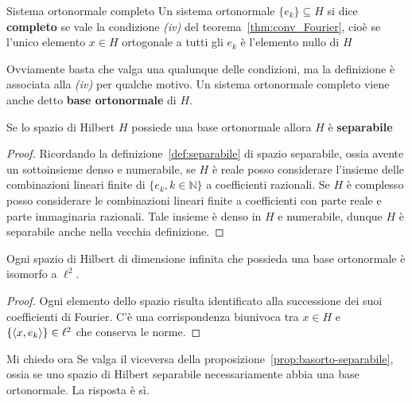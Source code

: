 \begin{definition}{Sistema ortonormale completo}
    Un sistema ortonormale \(\{e_{k}\} \subseteq H \) si dice \textbf{completo}
    se vale la condizione \textit{(iv)} del teorema~\ref{thm:conv_Fourier}, cioè
    se l'unico elemento \(x \in H\) ortogonale a tutti gli \(e_{k}\) è
    l'elemento nullo di \(H\) 
\end{definition}
Ovviamente basta che valga una qualunque delle condizioni, ma la definizione è
associata alla \textit{(iv)} per qualche motivo. Un sistema ortonormale completo
viene anche detto \textbf{base ortonormale} di \(H\).
\begin{proposition}\label{prop:basorto-separabile}
Se lo spazio di Hilbert \(H\) possiede una base ortonormale allora \(H\) è
\textbf{separabile}
\end{proposition}
\begin{proof}
Ricordando la definizione~\ref{def:separabile} di spazio separabile, ossia
avente un sottoinsieme denso e numerabile, se \(H\) è reale posso considerare
l'insieme delle combinazioni lineari finite di \(\{e_{k}, k \in \mathbb{N}\} \)
a coefficienti razionali. Se \(H\) è complesso posso considerare le combinazioni
lineari finite a coefficienti con parte reale e parte immaginaria razionali.
Tale insieme è denso in \(H\) e numerabile, dunque \(H\) è separabile anche
nella vecchia definizione. %
\end{proof}

\begin{proposition}\label{prop:isomorfol2}
    Ogni spazio di Hilbert di dimensione infinita che possieda una base ortonormale
    è isomorfo a \(\ell^2\). 
\end{proposition}
\begin{proof}
    Ogni elemento dello spazio risulta identificato
    alla successione dei suoi coefficienti di Fourier. C'è una corrispondenza
    biunivoca tra \(x \in H\) e \(\{{\left\langle x, e_{k}\right\rangle}\} \in \ell^2\) che conserva
    le norme.
\end{proof}

Mi chiedo ora Se valga il viceversa della
proposizione~\ref{prop:basorto-separabile}, ossia se uno spazio di Hilbert
separabile necessariamente abbia una base ortonormale. La risposta è sì.

